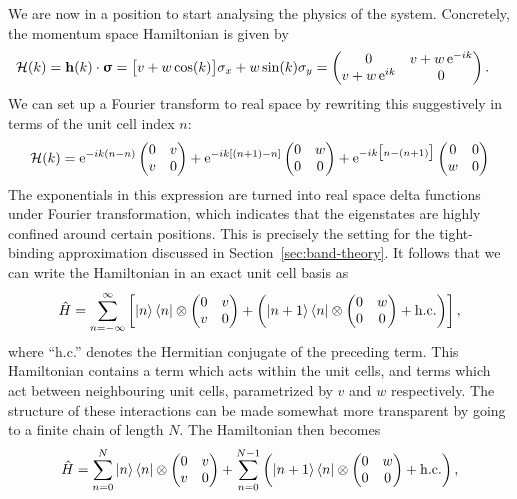 We are now in a position to start analysing the physics of the system. Concretely, the momentum space Hamiltonian is given by
\begin{align*}
	\mathcal{H}(k) &= \vb{h}(k)\cdot\bm{\upsigma} = \big[v + w\cos(k)\big]\sigma_x + w\sin(k)\sigma_y = \begin{pmatrix}
		0 & v + w\operatorname{e}^{-ik} \\
		v + w\operatorname{e}^{ik} & 0
	\end{pmatrix}.
\end{align*}
We can set up a Fourier transform to real space by rewriting this suggestively in terms of the unit cell index $n$:
\[
	\mathcal{H}(k) = \operatorname{e}^{-ik(n-n)}\begin{pmatrix}
		0 & v \\
		v & 0
	\end{pmatrix} + \operatorname{e}^{-ik[(n+1)-n]}\begin{pmatrix}
		0 & w \\
		0 & 0
	\end{pmatrix} + \operatorname{e}^{-ik\big[n-(n+1)\big]}\begin{pmatrix}
		0 & 0 \\
		w & 0
	\end{pmatrix}
\]
The exponentials in this expression are turned into real space delta functions under Fourier transformation, which indicates that the eigenstates are highly confined around certain positions. This is precisely the setting for the tight-binding approximation discussed in Section~\ref{sec:band-theory}. It follows that we can write the Hamiltonian in an exact unit cell basis as
\begin{equation}\label{eq:SSH-n-Hamil}
		\hat{H} = \sum_{n=-\infty}^{\infty}\left[\ket{n}\bra{n}\otimes\begin{pmatrix}
			0 & v \\
			v & 0
		\end{pmatrix} + \left(\ket{n+1}\bra{n}\otimes\begin{pmatrix}
			0 & w \\
			0 & 0
		\end{pmatrix} + {\rm h.c.}\right)\right], 
\end{equation}
where ``h.c.'' denotes the Hermitian conjugate of the preceding term. This Hamiltonian contains a term which acts within the unit cells, and terms which act between neighbouring unit cells, parametrized by $v$ and $w$ respectively. The structure of these interactions can be made somewhat more transparent by going to a finite chain of length $N$. The Hamiltonian then becomes
\[
	\hat{H} = \sum_{n=0}^{N}\ket{n}\bra{n}\otimes\begin{pmatrix}
		0 & v \\
		v & 0
	\end{pmatrix} + \sum_{n=0}^{N-1}\left(\ket{n+1}\bra{n}\otimes\begin{pmatrix}
		0 & w \\
		0 & 0
	\end{pmatrix} + {\rm h.c.}\right),
\]
